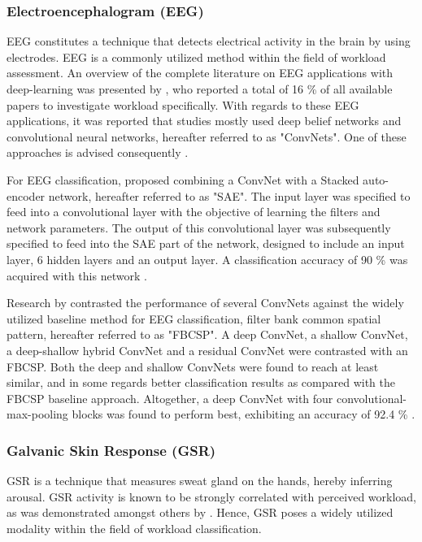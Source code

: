 \documentclass[12pt]{article}
\begin{document}
\subsubsection{Electroencephalogram (EEG)}
EEG constitutes a technique that detects electrical activity in the brain by using electrodes. EEG is a commonly utilized method within the field of workload assessment. An overview of the complete literature on EEG applications with deep-learning was presented by , who reported a total of 16 \% of all available papers to investigate workload specifically. With regards to these EEG applications, it was reported that studies mostly used deep belief networks and convolutional neural networks, hereafter referred to as "ConvNets". One of these approaches is advised consequently \cite{craik2019deep}.

For EEG classification,  proposed combining a ConvNet with a Stacked auto-encoder network, hereafter referred to as "SAE". The input layer was specified to feed into a convolutional layer with the objective of learning the filters and network parameters. The output of this convolutional layer was subsequently specified to feed into the SAE part of the network, designed to include an input layer, 6 hidden layers and an output layer. A classification accuracy of 90 \% was acquired with this network \cite{tabar2016novel}. 

Research by  contrasted the performance of several ConvNets against the widely utilized baseline method for EEG classification, filter bank common spatial pattern, hereafter referred to as "FBCSP". A deep ConvNet, a shallow ConvNet, a deep-shallow hybrid ConvNet and a residual ConvNet were contrasted with an FBCSP. Both the deep and shallow ConvNets were found to reach at least similar, and in some regards better classification results as compared with the FBCSP baseline approach. Altogether, a deep ConvNet with four convolutional-max-pooling blocks was found to perform best, exhibiting an accuracy of 92.4 \% \cite{schirrmeister2017deep}.

\subsubsection{Galvanic Skin Response (GSR)}
GSR is a technique that measures sweat gland on the hands, hereby inferring arousal. GSR activity is known to be strongly correlated with perceived workload, as was demonstrated amongst others by . Hence, GSR poses a widely utilized modality within the field of workload classification. 
\end{document}
